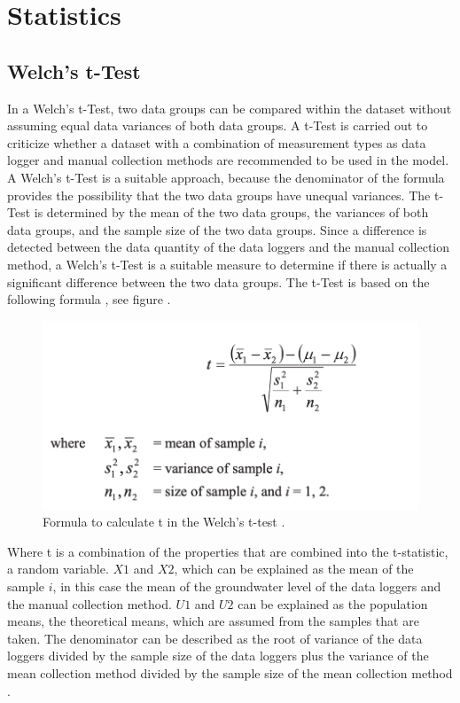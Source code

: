 \section{Statistics}
\subsection{Welch's t-Test}
In a Welch’s t-Test, two data groups can be compared within the dataset without assuming equal data variances of both data groups. A t-Test is carried out to criticize whether a dataset with a combination of measurement types as data logger and manual collection methods are recommended to be used in the model. A Welch’s t-Test is a suitable approach, because the denominator of the formula provides the possibility that the two data groups have unequal variances. The t-Test is determined by the mean of the two data groups, the variances of both data groups, and the sample size of the two data groups. Since a difference is detected between the data quantity of the data loggers and the manual collection method, a Welch’s t-Test is a suitable measure to determine if there is actually a significant difference between the two data groups. The t-Test is based on the following formula \cite{jung-2020}, see figure .
\begin{figure}[htbp]
    \centering
    \includegraphics[width=0.5\linewidth]{appendix/welch.png}
    \caption{Formula to calculate t in the Welch's t-test \cite{jung-2020}.}
    \label{T-test}
\end{figure}
\noindent
Where t is a combination of the properties that are combined into the t-statistic, a random variable. \(X1\) and \(X2\), which can be explained as the mean of the sample \(i\), in this case the mean of the groundwater level of the data loggers and the manual collection method. \(U1\) and \(U2\) can be explained as the population means, the theoretical means, which are assumed from the samples that are taken. The denominator can be described as the root of variance of the data loggers divided by the sample size of the data loggers plus the variance of the mean collection method divided by the sample size of the mean collection method \cite{jung-2020}. 
